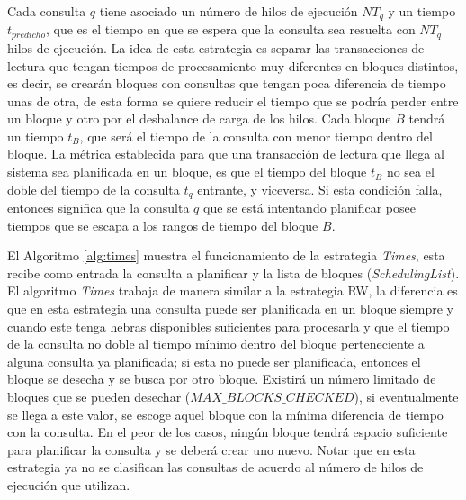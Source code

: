 Cada consulta $q$ tiene asociado un número de hilos de ejecución $NT_q$ y un tiempo $t_{predicho}$, que es el tiempo en que se espera que la consulta sea resuelta con $NT_q$ hilos de ejecución. La idea de esta estrategia es separar las transacciones de lectura que tengan tiempos de procesamiento muy diferentes en bloques distintos, es decir, se crearán bloques con consultas que tengan poca diferencia de tiempo unas de otra, de esta forma se quiere reducir el tiempo que se podría perder entre un bloque y otro por el desbalance de carga de los hilos. Cada bloque $B$ tendrá un tiempo $t_B$, que será el tiempo de la consulta con menor tiempo dentro del bloque. La métrica establecida para que una transacción de lectura que llega al sistema sea planificada en un bloque, es que el tiempo del bloque $t_B$ no sea el doble del tiempo de la consulta $t_q$ entrante, y viceversa. Si esta condición falla, entonces significa que la consulta $q$ que se está intentando planificar posee tiempos que se escapa a los rangos de tiempo del bloque $B$.

El Algoritmo \ref{alg:times} muestra el funcionamiento de la estrategia \textit{Times}, esta recibe como entrada la consulta a planificar y la lista de bloques (\textit{SchedulingList}). El algoritmo \textit{Times} trabaja de manera similar a la estrategia RW, la diferencia es que en esta estrategia una consulta puede ser planificada en un bloque siempre y cuando este tenga hebras disponibles suficientes para procesarla y que el tiempo de la consulta no doble al tiempo mínimo dentro del bloque perteneciente a alguna consulta ya planificada; si esta no puede ser planificada, entonces el bloque se desecha y se busca por otro bloque. Existirá un número limitado de bloques que se pueden desechar (\textit{$MAX\_BLOCKS\_CHECKED$}), si eventualmente se llega a este valor, se escoge aquel bloque con la mínima diferencia de tiempo con la consulta. En el peor de los casos, ningún bloque tendrá espacio suficiente para planificar la consulta y se deberá crear uno nuevo. Notar que en esta estrategia ya no se clasifican las consultas de acuerdo al número de hilos de ejecución que utilizan. 


